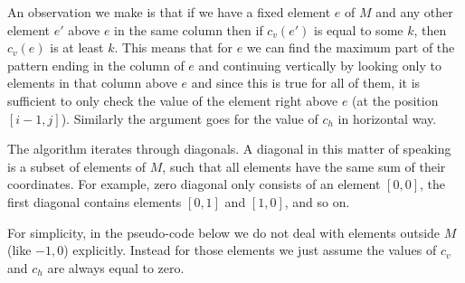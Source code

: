 An observation we make is that if we have a fixed element $e$ of $M$ and any other element $e'$ above $e$ in the same column then if $c_v(e')$ is equal to some $k$, then $c_v(e)$ is at least $k$. This means that for $e$ we can find the maximum part of the pattern ending in the column of $e$ and continuing vertically by looking only to elements in that column above $e$ and since this is true for all of them, it is sufficient to only check the value of the element right above $e$ (at the position $[i-1,j]$). Similarly the argument goes for the value of $c_h$ in horizontal way.

The algorithm iterates through diagonals. A diagonal in this matter of speaking is a subset of elements of $M$, such that all elements have the same sum of their coordinates. For example, zero diagonal only consists of an element $[0,0]$, the first diagonal contains elements $[0,1]$ and $[1,0]$, and so on.

For simplicity, in the pseudo-code below we do not deal with elements outside $M$ (like $-1,0$) explicitly. Instead for those elements we just assume the values of $c_v$ and $c_h$ are always equal to zero.

